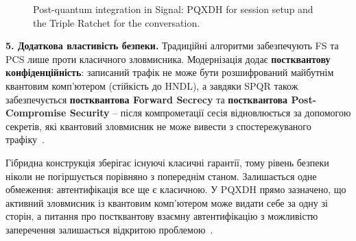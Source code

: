 \begin{figure}[H]
    \centering
    \caption{Post-quantum integration in Signal: PQXDH for session setup and the Triple Ratchet for the conversation.}
    \label{fig:pq}
\end{figure}

\textbf{5. Додаткова властивість безпеки.} Традиційні алгоритми забезпечують FS та PCS лише проти класичного 
зловмисника. Модернізація додає \textbf{постквантову конфіденційність}: записаний трафік не може бути розшифрований 
майбутнім квантовим комп’ютером (стійкість до HNDL), а завдяки SPQR також забезпечується 
\textbf{постквантова Forward Secrecy} та \textbf{постквантова Post-Compromise Security} -- після компрометації 
сесія відновлюється за допомогою секретів, які квантовий зловмисник не може вивести з спостережуваного трафіку~\cite{signal_pqxdh, signal_spqr}. 

Гібридна конструкція зберігає існуючі класичні гарантії, тому рівень безпеки ніколи не погіршується порівняно з 
попереднім станом. Залишається одне обмеження: автентифікація все ще є класичною. У PQXDH прямо зазначено, що 
активний зловмисник із квантовим комп’ютером може видати себе за одну зі сторін, а питання про постквантову 
взаємну автентифікацію з можливістю заперечення залишається відкритою проблемою~\cite{signal_pqxdh}.

